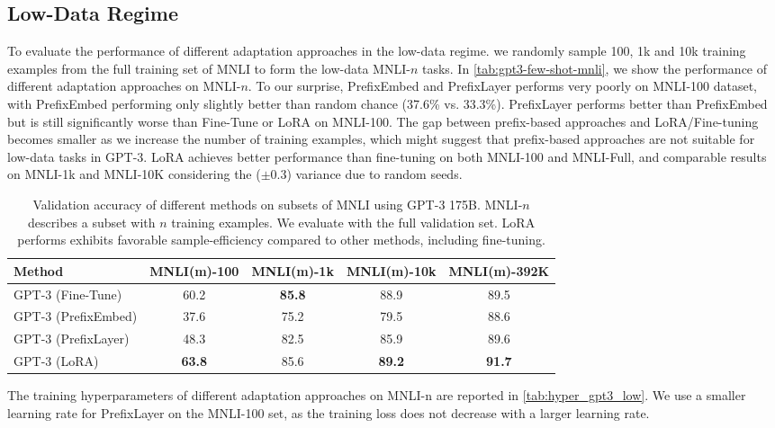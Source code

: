 \subsection{Low-Data Regime}
\label{app:low_data}
To evaluate the performance of different adaptation approaches in the low-data regime. we randomly sample 100, 1k and 10k training examples from the full training set of MNLI to form the low-data MNLI-$n$ tasks.
In \autoref{tab:gpt3-few-shot-mnli}, we show the performance of different adaptation approaches on MNLI-$n$. 
To our surprise, PrefixEmbed and PrefixLayer performs very poorly on MNLI-100 dataset, with PrefixEmbed performing only slightly better than random chance (37.6\% vs. 33.3\%).
PrefixLayer performs better than PrefixEmbed but is still significantly worse than Fine-Tune or LoRA on MNLI-100.
The gap between prefix-based approaches and LoRA/Fine-tuning becomes smaller as we increase the number of training examples, which might suggest that prefix-based approaches are not suitable for low-data tasks in GPT-3.
LoRA achieves better performance than fine-tuning on both MNLI-100 and MNLI-Full, and comparable results on MNLI-1k and MNLI-10K considering the ($\pm0.3$) variance due to random seeds. 
\begin{table}[h]
\centering
\begin{tabular}{l|cccc}
\hline
\toprule
Method & MNLI(m)-100 &  MNLI(m)-1k &  MNLI(m)-10k &  MNLI(m)-392K \\
\midrule
GPT-3 (Fine-Tune)  & 60.2  & \textbf{85.8} & 88.9 & 89.5 \\
GPT-3 (PrefixEmbed) & 37.6  & 75.2  & 79.5 & 88.6 \\
GPT-3 (PrefixLayer) & 48.3  & 82.5  & 85.9 & 89.6 \\
GPT-3 (LoRA)         & \textbf{63.8}   & 85.6  & \textbf{89.2} & \textbf{91.7} \\
\bottomrule
\end{tabular}
\caption{Validation accuracy of different methods on subsets of MNLI using GPT-3 175B. MNLI-$n$ describes a subset with $n$ training examples. We evaluate with the full validation set. LoRA performs exhibits favorable sample-efficiency compared to other methods, including fine-tuning.}
\label{tab:gpt3-few-shot-mnli}
\end{table}

The training hyperparameters of different adaptation approaches on MNLI-{n} are reported in \autoref{tab:hyper_gpt3_low}.
We use a smaller learning rate for PrefixLayer on the MNLI-100 set, as the training loss does not decrease with a larger learning rate.


